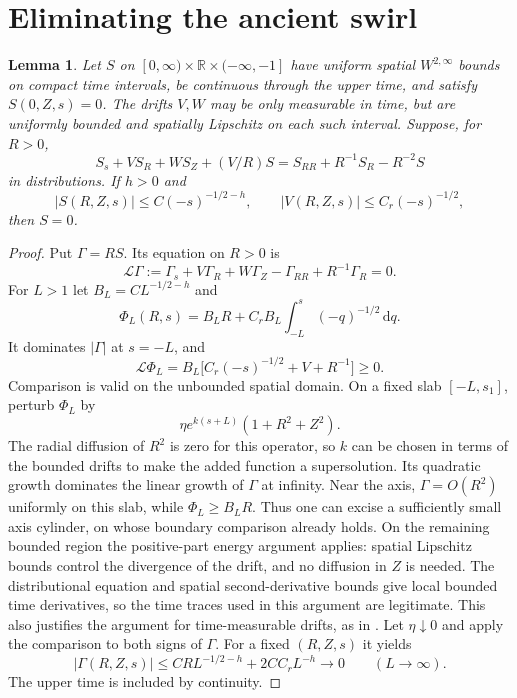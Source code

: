 \documentclass[11pt]{article}
\newtheorem{lemma}[theorem]{Lemma}
\theoremstyle{remark}
\newcommand{\R}{\mathbb R}
\newcommand{\dd}{\,\mathrm d}
\begin{document}
\section{Eliminating the ancient swirl}

\begin{lemma}\label{lem:ancientswirl}
Let $S$ on $[0,\infty)\times\R\times(-\infty,-1]$ have uniform
spatial $W^{2,\infty}$ bounds on compact time intervals, be continuous
through the upper time, and satisfy $S(0,Z,s)=0$.
The drifts $V,W$ may be only measurable in time, but are uniformly bounded
and spatially Lipschitz on each such interval. Suppose, for $R>0$,
\begin{equation}\label{eq:ancientswirl}
 S_s+V S_R+W S_Z+(V/R)S
                    =S_{RR}+R^{-1}S_R-R^{-2}S
\end{equation}
in distributions. If $h>0$ and
\[
 |S(R,Z,s)|\leq C(-s)^{-1/2-h},\qquad
 |V(R,Z,s)|\leq C_r(-s)^{-1/2},
\]
then $S=0$.
\end{lemma}
\begin{proof}
Put $\Gamma=RS$. Its equation on $R>0$ is
\[
 \mathcal L\Gamma:=\Gamma_s+V\Gamma_R+W\Gamma_Z
                      -\Gamma_{RR}+R^{-1}\Gamma_R=0.
\]
For $L>1$ let $B_L=CL^{-1/2-h}$ and
\[
 \Phi_L(R,s)=B_LR+C_rB_L\int_{-L}^s(-q)^{-1/2}\dd q.
\]
It dominates $|\Gamma|$ at $s=-L$, and
\[
 \mathcal L\Phi_L=B_L\big[C_r(-s)^{-1/2}+V+R^{-1}\big]\geq0.
\]
Comparison is valid on the unbounded spatial domain. On a fixed
slab $[-L,s_1]$, perturb $\Phi_L$ by
\[
 \eta e^{k(s+L)}(1+R^2+Z^2).
\]
The radial diffusion
of $R^2$ is zero for this operator, so $k$ can be chosen in terms of
the bounded drifts to make the added function a supersolution.
Its quadratic growth dominates the linear growth of $\Gamma$ at infinity.
Near the axis, $\Gamma=O(R^2)$ uniformly on this slab, while
$\Phi_L\geq B_LR$. Thus one can excise a sufficiently small axis
cylinder, on whose boundary comparison already holds. On the remaining
bounded region the positive-part energy argument applies: spatial
Lipschitz bounds control the divergence of the drift, and no diffusion
in $Z$ is needed. The distributional equation and spatial second-derivative
bounds give local bounded time derivatives, so the time traces used in
this argument are legitimate. This also justifies the argument for
time-measurable drifts, as in \cite[Lemma~3.3]{CIV}.
Let $\eta\downarrow0$ and apply the comparison to both signs of $\Gamma$.
For a fixed $(R,Z,s)$ it yields
\[
 |\Gamma(R,Z,s)|\leq CRL^{-1/2-h}+2CC_rL^{-h}\longrightarrow0
 \qquad(L\longrightarrow\infty).
\]
The upper time is included by continuity.
\end{proof}
\end{document}
